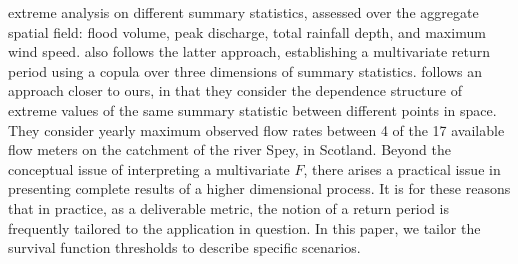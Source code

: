     extreme analysis on different summary statistics, assessed over the aggregate spatial field: 
    flood volume, peak discharge, total rainfall depth, and maximum wind speed.  
    \cite{graler2013} also follows the latter approach, establishing a multivariate return 
    period using a copula over three dimensions of summary statistics.
    \cite{salvadori2010} follows an approach closer to ours, in that they consider the dependence 
    structure of extreme values of the same summary statistic between different points in space.  
    They consider yearly maximum observed flow rates between 4 of the 17 available flow meters 
    on the catchment of the river Spey, in Scotland. Beyond the conceptual issue of 
    interpreting a multivariate $F$, there arises a practical issue in presenting
    complete results of a higher dimensional process.
    It is for these reasons that in practice, as a deliverable metric, the notion of a 
    return period is frequently tailored to the application in question.  In this paper, 
    we tailor the survival function thresholds to describe specific scenarios. 

